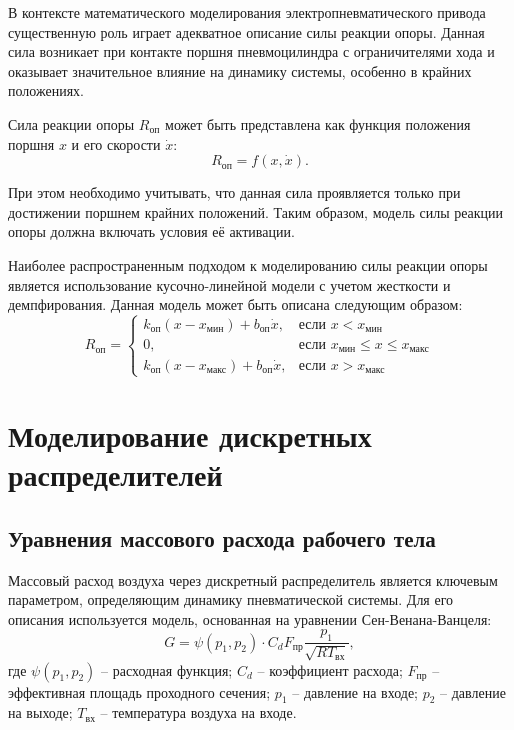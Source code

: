 В контексте математического моделирования электропневматического привода существенную роль играет
адекватное описание силы реакции опоры. Данная сила возникает при контакте поршня пневмоцилиндра
с ограничителями хода и оказывает значительное влияние на динамику системы, особенно в крайних положениях.

Сила реакции опоры $R_\text{оп}$ может быть представлена как функция положения поршня $x$ и его скорости $\dot{x}$:
\begin{equation*}
    R_\text{оп} = f(x, \dot{x}).
\end{equation*}

При этом необходимо учитывать, что данная сила проявляется только при достижении
поршнем крайних положений. Таким образом, модель силы реакции опоры должна включать
условия её активации.

Наиболее распространенным подходом к моделированию силы реакции опоры является использование кусочно-линейной модели с учетом жесткости и демпфирования. Данная модель может быть описана следующим образом:
\begin{equation}
\label{eq:ch2/support_reaction}
    R_\text{оп} = \begin{cases}
        k_\text{оп}(x - x_\text{мин}) + b_\text{оп}\dot{x},  & \text{если } x < x_\text{мин}                       \\
        0,                                                   & \text{если } x_\text{мин} \leq x \leq x_\text{макс} \\
        k_\text{оп}(x - x_\text{макс}) + b_\text{оп}\dot{x}, & \text{если } x > x_\text{макс}
    \end{cases}
\end{equation}

\section{Моделирование дискретных распределителей}\label{sec:ch2/sec3}

\subsection{Уравнения массового расхода рабочего тела}\label{sec:ch2/sec3/subsec1}
Массовый расход воздуха через дискретный распределитель
является ключевым параметром, определяющим динамику пневматической
системы. Для его описания используется модель, основанная на уравнении Сен-Венана-Ванцеля:
\begin{equation}
    G = \psi(p_1, p_2) \cdot C_d F_\text{пр} \frac{p_1}{\sqrt{RT_\text{вх}}},
\end{equation}
где
$\psi(p_1, p_2)$ -- расходная функция;
$C_d$ -- коэффициент расхода;
$F_\text{пр}$ -- эффективная площадь проходного сечения;
$p_1$ -- давление на входе;
$p_2$ -- давление на выходе;
$T_\text{вх}$ -- температура воздуха на входе.

